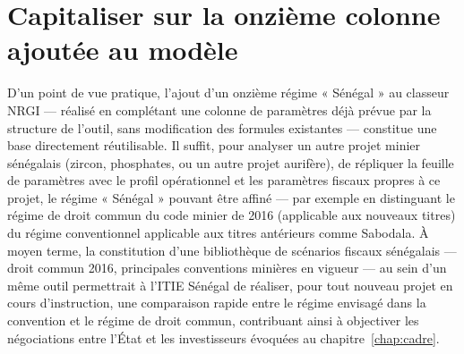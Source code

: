 \section{Capitaliser sur la onzième colonne ajoutée au modèle}

D'un point de vue pratique, l'ajout d'un onzième régime « Sénégal » au classeur NRGI --- réalisé en complétant une colonne de paramètres déjà prévue par la structure de l'outil, sans modification des formules existantes --- constitue une base directement réutilisable. Il suffit, pour analyser un autre projet minier sénégalais (zircon, phosphates, ou un autre projet aurifère), de répliquer la feuille de paramètres avec le profil opérationnel et les paramètres fiscaux propres à ce projet, le régime « Sénégal » pouvant être affiné --- par exemple en distinguant le régime de droit commun du code minier de 2016 (applicable aux nouveaux titres) du régime conventionnel applicable aux titres antérieurs comme Sabodala. À moyen terme, la constitution d'une bibliothèque de scénarios fiscaux sénégalais --- droit commun 2016, principales conventions minières en vigueur --- au sein d'un même outil permettrait à l'ITIE Sénégal de réaliser, pour tout nouveau projet en cours d'instruction, une comparaison rapide entre le régime envisagé dans la convention et le régime de droit commun, contribuant ainsi à objectiver les négociations entre l'État et les investisseurs évoquées au chapitre~\ref{chap:cadre}.
